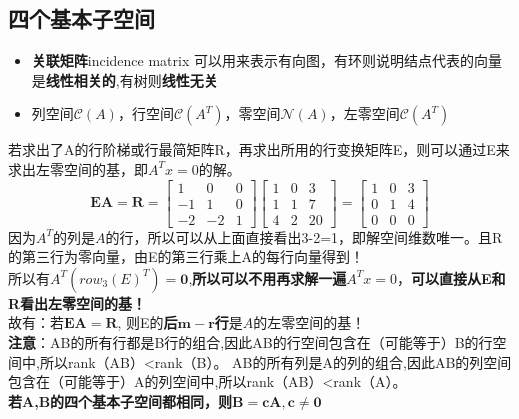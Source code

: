     \subsection{四个基本子空间}
    \begin{itemize}
        \item \textbf{关联矩阵}incidence matrix 可以用来表示有向图，有环则说明结点代表的向量是\textbf{线性相关的},有树则\textbf{线性无关}
        \item 列空间$\mathcal{C}(A)$，行空间$\mathcal{C}(A^T)$，零空间$\mathcal{N}(A)$，左零空间$\mathcal{C}(A^T)$
    \end{itemize}
    若求出了A的行阶梯或行最简矩阵R，再求出所用的行变换矩阵E，则可以通过E来求出左零空间的基，即$A^Tx=0$的解。
    \\
    $$\boldsymbol{E} \boldsymbol{A}=\boldsymbol{R}
    =
    \left[\begin{array}{rrr}{1} & {0} & {0} \\ {-1} & {1} & {0} \\ {-2} & {-2} & {1}\end{array}\right]
    \left[\begin{array}{lll}{1} & {0} & {3} \\ {1} & {1} & {7} \\ {4} & {2} & {20}\end{array}\right]
    =
    \left[\begin{array}{lll}{1} & {0} & {3} \\ {0} & {1} & {4} \\ {0} & {0} & {0}\end{array}\right]
    $$
    因为$A^T$的列是$A$的行，所以可以从上面直接看出3-2=1，即解空间维数唯一。且R的第三行为零向量，由E的第三行乘上A的每行向量得到！
    \\
    所以有$A^T({row_3(E)}^T)=\textbf{0}$,\textbf{所以可以不用再求解一遍}$A^Tx=0$，\textbf{可以直接从E和R看出左零空间的基！}
    \\
    故有：若$\boldsymbol{E} \boldsymbol{A}=\boldsymbol{R}$, 则E的\textbf{后$\bm{m-r}$行}是$A$的左零空间的基！
    \\
    \textbf{注意}：AB的所有行都是B行的组合,因此AB的行空间包含在（可能等于）B的行空间中,所以rank（AB）<rank（B）。
    AB的所有列是A的列的组合,因此AB的列空间包含在（可能等于）A的列空间中,所以rank（AB）<rank（A）。
    \\
    \textbf{若A,B的四个基本子空间都相同，则}$\bm{B=cA,c\neq 0}$
